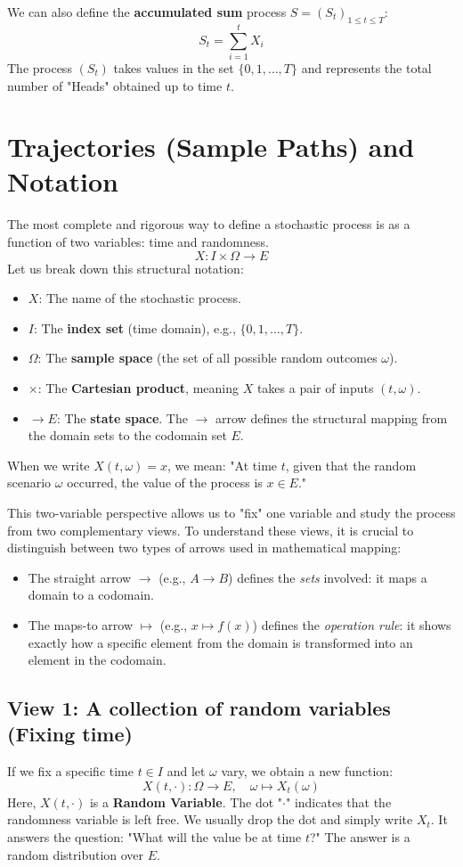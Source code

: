 We can also define the \textbf{accumulated sum} process $S = (S_t)_{1 \leq t \leq T}$:
\[
S_t = \sum_{i=1}^t X_i
\]
The process $(S_t)$ takes values in the set $\{0, 1, \dots, T\}$ and represents the total number of "Heads" obtained up to time $t$.

\section{Trajectories (Sample Paths) and Notation}

The most complete and rigorous way to define a stochastic process is as a function of two variables: time and randomness.
\[
X : I \times \Omega \to E
\]
Let us break down this structural notation:
\begin{itemize}
    \item $X$: The name of the stochastic process.
    \item $I$: The \textbf{index set} (time domain), e.g., $\{0, 1, \dots, T\}$.
    \item $\Omega$: The \textbf{sample space} (the set of all possible random outcomes $\omega$).
    \item $\times$: The \textbf{Cartesian product}, meaning $X$ takes a pair of inputs $(t, \omega)$.
    \item $\to E$: The \textbf{state space}. The $\to$ arrow defines the structural mapping from the domain sets to the codomain set $E$.
\end{itemize}

When we write $X(t, \omega) = x$, we mean: "At time $t$, given that the random scenario $\omega$ occurred, the value of the process is $x \in E$."

This two-variable perspective allows us to "fix" one variable and study the process from two complementary views. To understand these views, it is crucial to distinguish between two types of arrows used in mathematical mapping:
\begin{itemize}
    \item The straight arrow \textbf{$\to$} (e.g., $A \to B$) defines the \textit{sets} involved: it maps a domain to a codomain.
    \item The maps-to arrow \textbf{$\mapsto$} (e.g., $x \mapsto f(x)$) defines the \textit{operation rule}: it shows exactly how a specific element from the domain is transformed into an element in the codomain.
\end{itemize}

\subsection{View 1: A collection of random variables (Fixing time)}
If we fix a specific time $t \in I$ and let $\omega$ vary, we obtain a new function:
\[
X(t, \cdot) : \Omega \to E, \quad \omega \mapsto X_t(\omega)
\]
Here, $X(t, \cdot)$ is a \textbf{Random Variable}. The dot "$\cdot$" indicates that the randomness variable is left free. We usually drop the dot and simply write \textbf{$X_t$}. It answers the question: "What will the value be at time $t$?" The answer is a random distribution over $E$.

